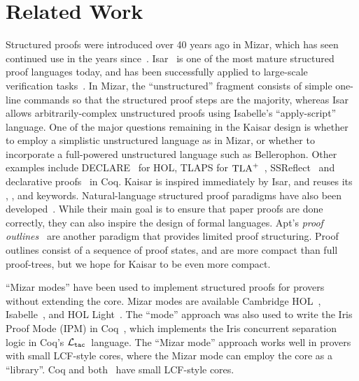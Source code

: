 \documentclass[12pt]{cmuthesis}
\theoremstyle{definition}
\theoremstyle{remark}
\newcommand{\ltac}{\ensuremath{\mathcal{L}_{\tt tac}}~}
\begin{document}
\section{Related Work}
\label{sec:kaisar-relwork}
Structured proofs were introduced over 40 years ago in Mizar, which has seen continued use in the years since~\cite{conf/mkm/BancerekBGKMNPU15,Wenzel2002}.
Isar~\cite{DBLP:conf/mkm/Wenzel06,DBLP:conf/tphol/Wenzel99,Wenzel07isabelle/isar} is one of the most mature structured proof languages today, and has been successfully applied to large-scale verification tasks~\cite{Nipkow2002,DBLP:journals/cacm/KleinAEHCDEEKNSTW10,DBLP:journals/afp/Lochbihler07}.
In Mizar, the ``unstructured'' fragment consists of simple one-line commands so that the structured proof steps are the majority, whereas Isar allows arbitrarily-complex unstructured proofs using Isabelle's ``apply-script'' language.
One of the major questions remaining in the Kaisar design is whether to employ a simplistic unstructured language as in Mizar, or whether to incorporate a full-powered unstructured language such as Bellerophon.
Other examples include DECLARE~\cite{Syme1997DECLAREAP} for HOL, TLAPS for ${\rm TLA}^+$~\cite{DBLP:conf/fm/CousineauDLMRV12,Lamport:hybrid:1992}, SSReflect~\cite{DBLP:journals/jfrea/GonthierM10} and declarative proofs~\cite{DBLP:conf/types/Corbineau07} in Coq.
Kaisar is inspired immediately by Isar, and reuses its \kwnote{}, \kwshow{}, and \kwhave{} keywords.
Natural-language structured proof paradigms have also been developed~\cite{Lamport12,Lamport95}.
While their main goal is to ensure that paper proofs are done correctly, they can also inspire the design of formal languages.
Apt's \emph{proof outlines}~\cite{apt2010verification} are another paradigm that provides limited proof structuring.
Proof outlines consist of a sequence of proof states, and are more compact than full proof-trees, but we hope for Kaisar to be even more compact.

``Mizar modes'' have been used to implement structured proofs for provers without extending the core.
Mizar modes are available Cambridge HOL~\cite{DBLP:conf/tphol/Harrison96}, Isabelle~\cite{DBLP:conf/cpp/KaliszykPU16}, and HOL Light~\cite{DBLP:conf/tphol/Wiedijk01}.
The ``mode'' approach was also used to write the Iris Proof Mode (IPM) in Coq~\cite{DBLP:conf/popl/KrebbersTB17}, which implements the Iris concurrent separation logic in Coq's \ltac language.
The ``Mizar mode'' approach works well in provers with small LCF-style cores, where the Mizar mode can employ the core as a ``library''.
Coq and \KeYmaeraX both~\cite{Barras:1997,DBLP:conf/cpp/BohrerRVVP17} have small LCF-style cores.
\end{document}
